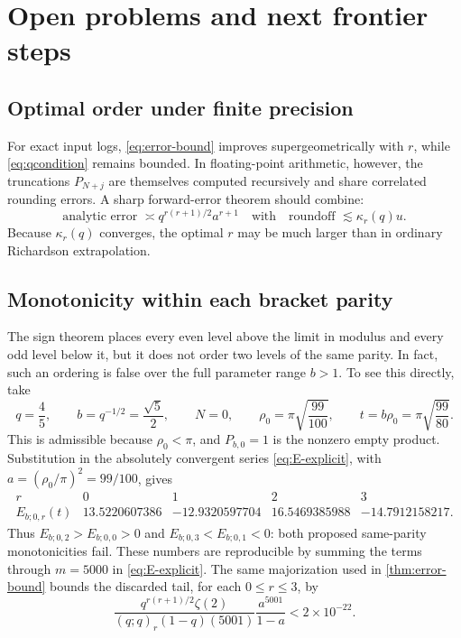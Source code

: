 \documentclass[11pt]{article}
\theoremstyle{definition}
\theoremstyle{remark}
\begin{document}
\section{Open problems and next frontier steps}
\label{sec:open}

\subsection{Optimal order under finite precision}

For exact input logs, \cref{eq:error-bound} improves supergeometrically with $r$, while \cref{eq:qcondition} remains bounded. In floating-point arithmetic, however, the truncations $P_{N+j}$ are themselves computed recursively and share correlated rounding errors. A sharp forward-error theorem should combine:
\[
\text{analytic error }\asymp q^{r(r+1)/2}a^{r+1}
\quad\text{with}\quad
\text{roundoff }\lesssim\kappa_r(q)u.
\]
Because $\kappa_r(q)$ converges, the optimal $r$ may be much larger than in ordinary Richardson extrapolation.

\subsection{Monotonicity within each bracket parity}

The sign theorem places every even level above the limit in modulus and every odd level
below it, but it does not order two levels of the same parity.  In fact, such an ordering is
false over the full parameter range $b>1$.  To see this directly, take
\[
 q=\frac45,\qquad b=q^{-1/2}=\frac{\sqrt5}{2},\qquad N=0,
 \qquad \rho_0=\pi\sqrt{\frac{99}{100}},
 \qquad t=b\rho_0=\pi\sqrt{\frac{99}{80}}.
\]
This is admissible because $\rho_0<\pi$, and $P_{b,0}=1$ is the nonzero empty product.
Substitution in the absolutely convergent series \eqref{eq:E-explicit}, with
$a=(\rho_0/\pi)^2=99/100$, gives
\[
\begin{array}{c|rrrr}
r&0&1&2&3\\ \hline
E_{b;0,r}(t)
& 13.5220607386&-12.9320597704&16.5469385988&-14.7912158217.
\end{array}
\]
Thus $E_{b;0,2}>E_{b;0,0}>0$ and
$E_{b;0,3}<E_{b;0,1}<0$: both proposed same-parity monotonicities fail.
These numbers are reproducible by summing the terms through $m=5000$ in
\eqref{eq:E-explicit}.  The same majorization used in \cref{thm:error-bound} bounds the
discarded tail, for each $0\le r\le3$, by
\[
 \frac{q^{r(r+1)/2}\zeta(2)}
 {(q;q)_r(1-q)(5001)}\frac{a^{5001}}{1-a}<2\times10^{-22}.
\]
\end{document}
